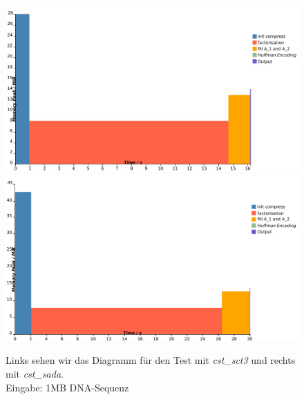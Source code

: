 \documentclass[a4paper,11pt]{scrartcl}%
\theoremstyle{change}
\theoremstyle{nonumberplain}
\theoremstyle{change}
\theoremstyle{nonumberplain}
\theoremstyle{change}
\theoremstyle{nonumberplain}
\begin{document}
\begin{figure}[h]
	\includegraphics[scale=0.27]{./pics/1MB_DNA_sct3}
	\includegraphics[scale=0.27]{./pics/1MB_DNA_sada}
	\caption{Links sehen wir das Diagramm für den Test mit \textit{cst\_sct3} und rechts mit \textit{cst\_sada}.\\ Eingabe: 1MB DNA-Sequenz}
	\label{fig:suffix_trees_test_dna}
\end{figure}
\end{document}
